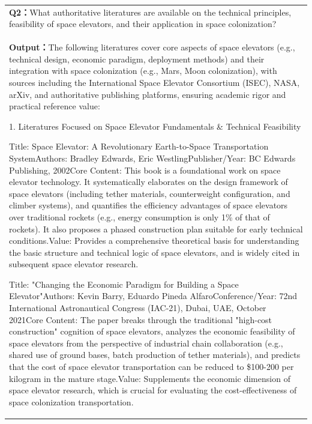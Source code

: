 \begin{longtable}[]{@{}
  >{\raggedright\arraybackslash}p{}@{}}
\toprule
\endhead
\textbf{Q2：}What authoritative literatures are available on the
technical principles, feasibility of space elevators, and their
application in space colonization? \\
\textbf{Output：}The following literatures cover core aspects of space
elevators (e.g., technical design, economic paradigm, deployment
methods) and their integration with space colonization (e.g., Mars, Moon
colonization), with sources including the International Space Elevator
Consortium (ISEC), NASA, arXiv, and authoritative publishing platforms,
ensuring academic rigor and practical reference value:

1. Literatures Focused on Space Elevator Fundamentals \& Technical
Feasibility

Title: Space Elevator: A Revolutionary Earth-to-Space Transportation
SystemAuthors: Bradley Edwards, Eric WestlingPublisher/Year: BC Edwards
Publishing, 2002Core Content: This book is a foundational work on space
elevator technology. It systematically elaborates on the design
framework of space elevators (including tether materials, counterweight
configuration, and climber systems), and quantifies the efficiency
advantages of space elevators over traditional rockets (e.g., energy
consumption is only 1\% of that of rockets). It also proposes a phased
construction plan suitable for early technical conditions.Value:
Provides a comprehensive theoretical basis for understanding the basic
structure and technical logic of space elevators, and is widely cited in
subsequent space elevator research.

Title: "Changing the Economic Paradigm for Building a Space
Elevator"Authors: Kevin Barry, Eduardo Pineda AlfaroConference/Year:
72nd International Astronautical Congress (IAC-21), Dubai, UAE, October
2021Core Content: The paper breaks through the traditional "high-cost
construction" cognition of space elevators, analyzes the economic
feasibility of space elevators from the perspective of industrial chain
collaboration (e.g., shared use of ground bases, batch production of
tether materials), and predicts that the cost of space elevator
transportation can be reduced to \$100-200 per kilogram in the mature
stage.Value: Supplements the economic dimension of space elevator
research, which is crucial for evaluating the cost-effectiveness of
space colonization transportation.


\end{longtable}
